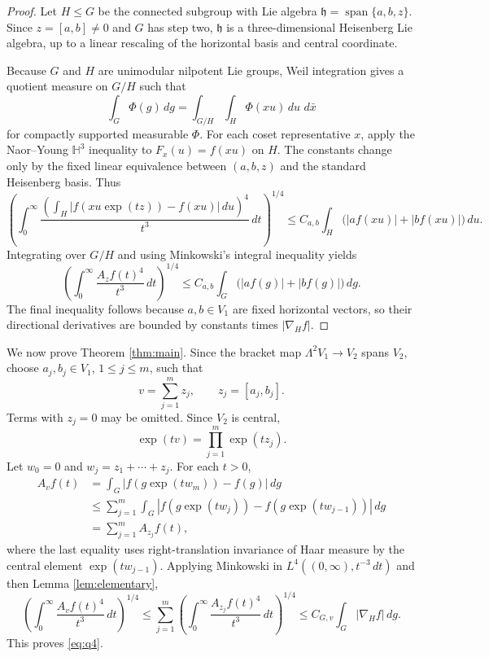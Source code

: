 \documentclass[11pt]{article}
\newcommand{\HH}{\mathbb H}
\newcommand{\dd}{\,d}
\newcommand{\abs}[1]{\left\lvert #1\right\rvert}
\begin{document}
\begin{proof}
Let \(H\leq G\) be the connected subgroup with Lie algebra
\(\mathfrak h=\operatorname{span}\{a,b,z\}\). Since \(z=[a,b]\neq 0\) and \(G\) has step two,
\(\mathfrak h\) is a three-dimensional Heisenberg Lie algebra, up to a linear rescaling of the
horizontal basis and central coordinate.

Because \(G\) and \(H\) are unimodular nilpotent Lie groups, Weil integration gives a quotient
measure on \(G/H\) such that
\[
\int_G \Phi(g)\dd g=\int_{G/H}\int_H \Phi(xu)\dd u\,\dd \bar x
\]
for compactly supported measurable \(\Phi\). For each coset representative \(x\), apply the
Naor--Young \(\HH^3\) inequality to \(F_x(u)=f(xu)\) on \(H\). The constants change only by the
fixed linear equivalence between \((a,b,z)\) and the standard Heisenberg basis. Thus
\[
\left(\int_0^\infty
\frac{\left(\int_H \abs{f(xu\exp(tz))-f(xu)}\dd u\right)^4}{t^3}\dd t\right)^{1/4}
\leq
C_{a,b}\int_H \bigl(\abs{a f(xu)}+\abs{b f(xu)}\bigr)\dd u .
\]
Integrating over \(G/H\) and using Minkowski's integral inequality yields
\[
\left(\int_0^\infty \frac{A_zf(t)^4}{t^3}\dd t\right)^{1/4}
\leq
C_{a,b}\int_G \bigl(\abs{a f(g)}+\abs{b f(g)}\bigr)\dd g .
\]
The final inequality follows because \(a,b\in V_1\) are fixed horizontal vectors, so their
directional derivatives are bounded by constants times \(\abs{\nabla_H f}\).
\end{proof}

We now prove Theorem \ref{thm:main}. Since the bracket map
\(\Lambda^2 V_1\to V_2\) spans \(V_2\), choose \(a_j,b_j\in V_1\), \(1\leq j\leq m\), such that
\[
v=\sum_{j=1}^m z_j,\qquad z_j=[a_j,b_j].
\]
Terms with \(z_j=0\) may be omitted. Since \(V_2\) is central,
\[
\exp(tv)=\prod_{j=1}^m \exp(tz_j).
\]
Let \(w_0=0\) and \(w_j=z_1+\cdots+z_j\). For each \(t>0\),
\begin{align*}
A_vf(t)
&=\int_G \abs{f(g\exp(tw_m))-f(g)}\dd g\\
&\leq \sum_{j=1}^m
\int_G
\abs{f(g\exp(tw_j))-f(g\exp(tw_{j-1}))}\dd g\\
&=\sum_{j=1}^m A_{z_j}f(t),
\end{align*}
where the last equality uses right-translation invariance of Haar measure by the central element
\(\exp(tw_{j-1})\). Applying Minkowski in \(L^4((0,\infty),t^{-3}\dd t)\) and then
Lemma \ref{lem:elementary},
\[
\left(\int_0^\infty \frac{A_vf(t)^4}{t^3}\dd t\right)^{1/4}
\leq
\sum_{j=1}^m
\left(\int_0^\infty \frac{A_{z_j}f(t)^4}{t^3}\dd t\right)^{1/4}
\leq C_{G,v}\int_G \abs{\nabla_H f}\dd g .
\]
This proves \eqref{eq:q4}.
\end{document}
